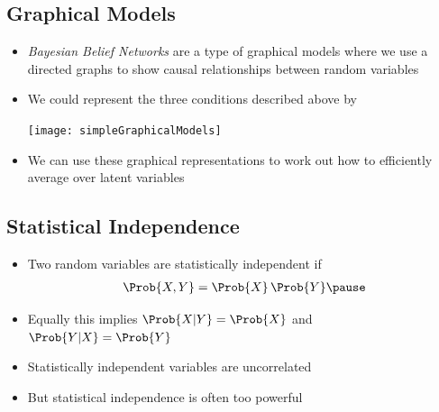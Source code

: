 
\begin{slide}
\section{Graphical Models}

\begin{PauseHighLight}
  \begin{itemize}
  \item \emph{Bayesian Belief Networks} are a type of graphical models
    where we use a directed graphs to show causal relationships
    between random variables\pause
  \item We could represent the three conditions described above by
    \begin{center}
      \texttt{[image: simpleGraphicalModels]}\pause
    \end{center}
  \item We can use these graphical representations to work out how to
    efficiently average over latent variables\pause
  \end{itemize}
\end{PauseHighLight}

\end{slide}


\begin{slide}
\section{Statistical Independence}

\begin{PauseHighLight}
  \begin{itemize}
  \item Two random variables are statistically independent if
    \begin{align*}
      \Prob{X,Y} = \Prob{X} \, \Prob{Y}\pause
    \end{align*}
  \item Equally this implies $\Prob{X|Y} = \Prob{X}$ and $\Prob{Y|X} =
    \Prob{Y}$\pause
  \item Statistically independent variables are uncorrelated\pause
  \item But statistical independence is often too powerful\pause
  \end{itemize}
\end{PauseHighLight}

\end{slide}

